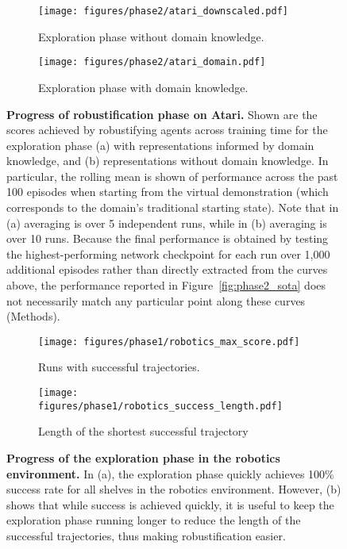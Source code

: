 \documentclass{nature}
\begin{document}
\begin{figure}[ht!]
        \centering
        \begin{subfigure}[]{\textwidth}
            \centering
            \texttt{[image: figures/phase2/atari\_downscaled.pdf]}
            \caption{Exploration phase without domain knowledge.}
        \end{subfigure}
        \begin{subfigure}[]{\textwidth}
            \centering
            \texttt{[image: figures/phase2/atari\_domain.pdf]}
            \caption{Exploration phase with domain knowledge.}
        \end{subfigure}
        \caption{\textbf{Progress of robustification phase on Atari.} Shown are the scores achieved by robustifying agents across training time for the exploration phase (a) with representations informed by domain knowledge, and (b) representations without domain knowledge. In particular, the rolling mean is shown of performance across the past 100 episodes when starting from the virtual demonstration (which corresponds to the domain's traditional starting state). Note that in (a) averaging is over 5 independent runs, while in (b) averaging is over 10 runs. Because the final performance is obtained by testing the highest-performing network checkpoint for each run over 1,000 additional episodes rather than directly extracted from the curves above, the performance reported in Figure~\ref{fig:phase2_sota} does not necessarily match any particular point along these curves (Methods).}
    \label{efig:phase2_atari}
\end{figure}


\begin{figure}[ht!]
    \centering
    \begin{subfigure}[t]{0.47\textwidth}
        \centering
        \texttt{[image: figures/phase1/robotics\_max\_score.pdf]}
        \caption{Runs with successful trajectories.}
        \label{efig:phase1_robotics_score}
    \end{subfigure}
    \begin{subfigure}[t]{0.47\textwidth}
        \centering
        \texttt{[image: figures/phase1/robotics\_success\_length.pdf]}
        \caption{Length of the shortest successful trajectory}        \label{efig:phase1_robotics_length}
    \end{subfigure}
    \caption{\textbf{Progress of the exploration phase in the robotics environment.} In (a), the exploration phase quickly achieves 100\% success rate for all shelves in the robotics environment. However, (b) shows that while success is achieved quickly, it is useful to keep the exploration phase running longer to reduce the length of the successful trajectories, thus making robustification easier.}
\end{figure}
\end{document}
